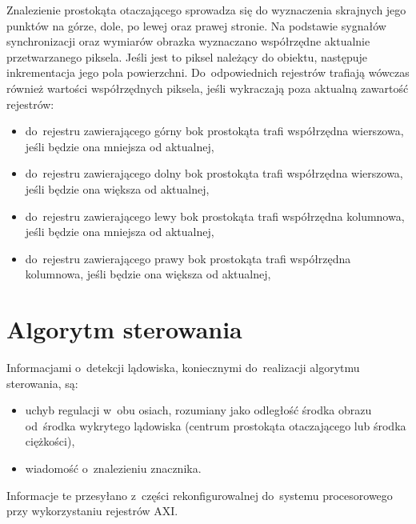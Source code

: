Znalezienie prostokąta otaczającego sprowadza się do wyznaczenia skrajnych jego punktów na górze, dole, po lewej oraz prawej stronie. 
Na podstawie sygnałów synchronizacji oraz wymiarów obrazka wyznaczano współrzędne aktualnie przetwarzanego piksela. 
Jeśli jest to piksel należący do obiektu, następuje inkrementacja jego pola powierzchni. 
Do~odpowiednich rejestrów trafiają wówczas również wartości współrzędnych piksela, jeśli wykraczają poza aktualną zawartość rejestrów:
\begin{itemize}
	\item do~rejestru zawierającego górny bok prostokąta trafi współrzędna wierszowa, jeśli będzie ona mniejsza od aktualnej,
	\item do~rejestru zawierającego dolny bok prostokąta trafi współrzędna wierszowa, jeśli będzie ona większa od aktualnej,
	\item do~rejestru zawierającego lewy bok prostokąta trafi współrzędna kolumnowa, jeśli będzie ona mniejsza od aktualnej,
	\item do~rejestru zawierającego prawy bok prostokąta trafi współrzędna kolumnowa, jeśli będzie ona większa od aktualnej,
\end{itemize}  


\section{Algorytm sterowania}
\label{sec:algorytm_sterowania}

Informacjami o~detekcji lądowiska, koniecznymi do~realizacji algorytmu sterowania, są:
\begin{itemize}
	\item uchyb regulacji w~obu osiach, rozumiany jako odległość środka obrazu od~środka wykrytego lądowiska (centrum prostokąta otaczającego lub środka ciężkości),
	\item wiadomość o~znalezieniu znacznika. %
\end{itemize}
Informacje te przesyłano z~części rekonfigurowalnej do~systemu procesorowego przy wykorzystaniu rejestrów AXI.

